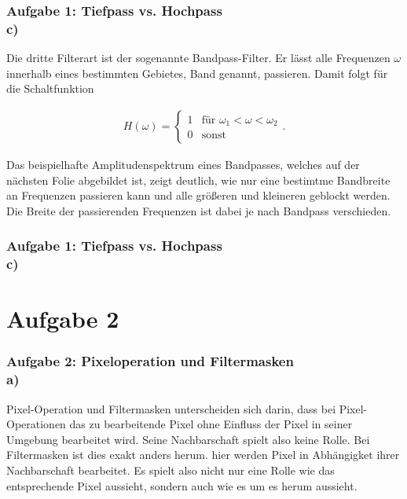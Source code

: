 \documentclass[accentcolor=tud9c,colorbacktitle,inverttitle,landscape,german,presentation,t]{tudbeamer}
\begin{document}
	\begin{frame}
	\frametitle{Aufgabe 1: Tiefpass vs. Hochpass \\ c)}
	Die dritte Filterart ist der sogenannte Bandpass-Filter. Er l\"asst alle Frequenzen $\omega$ innerhalb eines bestimmten Gebietes, Band genannt, passieren. Damit folgt f\"ur die Schaltfunktion
	
	\begin{align*}
	H(\omega) = \left\{\begin{array}{rl}1 & \textrm{f\"ur } \omega_1 < \omega < \omega_2 \\ 0 & \textrm{sonst} \end{array}\right. .	
\end{align*}	

Das beispielhafte Amplitudenspektrum eines Bandpasses, welches auf der n\"achsten Folie abgebildet ist, zeigt deutlich, wie nur eine bestimtme Bandbreite an Frequenzen passieren kann und alle gr\"o\ss eren und kleineren geblockt werden. Die Breite der passierenden Frequenzen ist dabei je nach Bandpass verschieden. 
\end{frame}

\begin{frame}
\frametitle{Aufgabe 1: Tiefpass vs. Hochpass \\ c)}

	\end{frame}
	
\section{Aufgabe 2}
	\begin{frame}
		\frametitle{Aufgabe 2: Pixeloperation und Filtermasken \\ a)}
			\label{2_a}
			Pixel-Operation und Filtermasken unterscheiden sich darin, dass bei Pixel-Operationen das zu bearbeitende Pixel ohne Einfluss der Pixel in seiner Umgebung bearbeitet wird. Seine Nachbarschaft spielt also keine Rolle. Bei Filtermasken ist dies exakt anders herum. hier werden Pixel in Abh\"angigket ihrer Nachbarschaft bearbeitet. Es spielt also nicht nur eine Rolle wie das entsprechende Pixel aussieht, sondern auch wie es um es herum aussieht.
	\end{frame}
\end{document}
